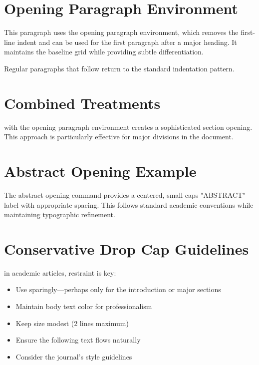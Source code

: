 \documentclass[11pt]{article}
\begin{document}
\section{Opening Paragraph Environment}

\begin{openingparagraph}
This paragraph uses the opening paragraph environment, which removes the first-line indent and can be used for the first paragraph after a major heading. It maintains the baseline grid while providing subtle differentiation.
\end{openingparagraph}

Regular paragraphs that follow return to the standard indentation pattern. \lipsum[5]

\section{Combined Treatments}

\begin{openingparagraph}
 with the opening paragraph environment creates a sophisticated section opening. This approach is particularly effective for major divisions in the document.
\end{openingparagraph}

\lipsum[6]

\section{Abstract Opening Example}

\abstractopening

\begin{openingparagraph}
The abstract opening command provides a centered, small caps "ABSTRACT" label with appropriate spacing. This follows standard academic conventions while maintaining typographic refinement.
\end{openingparagraph}

\section{Conservative Drop Cap Guidelines}

 in academic articles, restraint is key:

\begin{itemize}
\item Use sparingly—perhaps only for the introduction or major sections
\item Maintain body text color for professionalism
\item Keep size modest (2 lines maximum)
\item Ensure the following text flows naturally
\item Consider the journal's style guidelines
\end{itemize}
\end{document}

